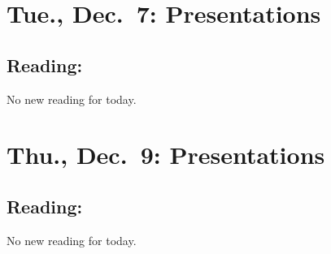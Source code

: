\documentclass[
]{article}
\begin{document}
\hypertarget{tue.-dec.-7-presentations}{%
\section{Tue., Dec.~7: Presentations}\label{tue.-dec.-7-presentations}}

\hypertarget{reading-26}{%
\subsection{Reading:}\label{reading-26}}

No new reading for today.

\hypertarget{thu.-dec.-9-presentations}{%
\section{Thu., Dec.~9: Presentations}\label{thu.-dec.-9-presentations}}

\hypertarget{reading-27}{%
\subsection{Reading:}\label{reading-27}}

No new reading for today.
\end{document}
